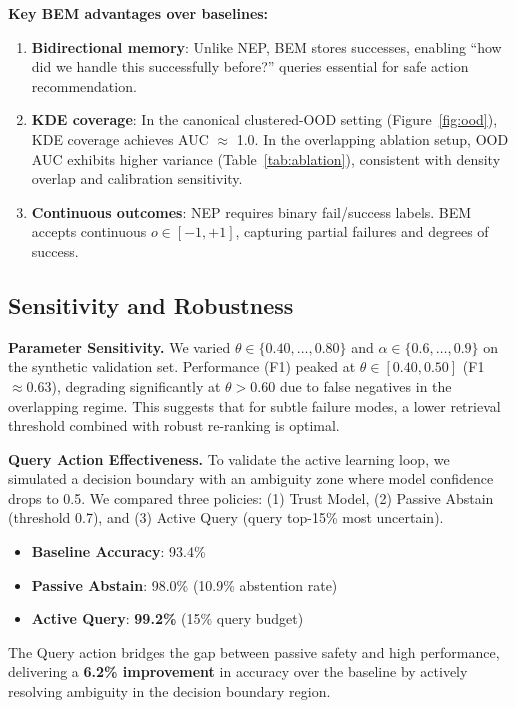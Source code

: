 \documentclass[twoside,11pt]{article}
\begin{document}
\textbf{Key BEM advantages over baselines:}
\begin{enumerate}
    \item \textbf{Bidirectional memory}: Unlike NEP, BEM stores successes, enabling ``how did we handle this successfully before?'' queries essential for safe action recommendation.
    \item \textbf{KDE coverage}: In the canonical clustered-OOD setting (Figure~\ref{fig:ood}), KDE coverage achieves AUC $\approx$ 1.0. In the overlapping ablation setup, OOD AUC exhibits higher variance (Table~\ref{tab:ablation}), consistent with density overlap and calibration sensitivity.
    \item \textbf{Continuous outcomes}: NEP requires binary fail/success labels. BEM accepts continuous $o \in [-1, +1]$, capturing partial failures and degrees of success.
\end{enumerate}

\subsection{Sensitivity and Robustness}
\label{sec:sensitivity}

\textbf{Parameter Sensitivity.} We varied $\theta \in \{0.40, \dots, 0.80\}$ and $\alpha \in \{0.6, \dots, 0.9\}$ on the synthetic validation set. Performance (F1) peaked at $\theta \in [0.40, 0.50]$ (F1 $\approx 0.63$), degrading significantly at $\theta > 0.60$ due to false negatives in the overlapping regime. This suggests that for subtle failure modes, a lower retrieval threshold combined with robust re-ranking is optimal.

\textbf{Query Action Effectiveness.} To validate the active learning loop, we simulated a decision boundary with an ambiguity zone where model confidence drops to 0.5. We compared three policies: (1) Trust Model, (2) Passive Abstain (threshold 0.7), and (3) Active Query (query top-15\% most uncertain).

\begin{itemize}
    \item \textbf{Baseline Accuracy}: 93.4\%
    \item \textbf{Passive Abstain}: 98.0\% (10.9\% abstention rate)
    \item \textbf{Active Query}: \textbf{99.2\%} (15\% query budget)
\end{itemize}

The Query action bridges the gap between passive safety and high performance, delivering a \textbf{6.2\% improvement} in accuracy over the baseline by actively resolving ambiguity in the decision boundary region.
\end{document}
